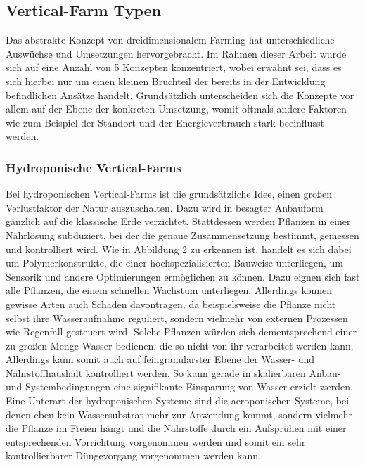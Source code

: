 \subsection{Vertical-Farm Typen}
Das abstrakte Konzept von dreidimensionalem Farming hat unterschiedliche Auswüchse und Umsetzungen hervorgebracht. Im Rahmen dieser Arbeit wurde sich auf eine Anzahl von 5 Konzepten konzentriert, wobei erwähnt sei, dass es sich hierbei nur um einen kleinen Bruchteil der bereits in der Entwicklung befindlichen Ansätze handelt. Grundsätzlich unterscheiden sich die Konzepte vor allem auf der Ebene der konkreten Umsetzung, womit oftmals andere Faktoren wie zum Beispiel der Standort und der Energieverbrauch stark beeinflusst werden.
\subsubsection{Hydroponische Vertical-Farms}
Bei hydroponischen Vertical-Farms ist die grundsätzliche Idee, einen großen Verlustfaktor der Natur auszuschalten. Dazu wird in besagter Anbauform gänzlich auf die klassische Erde verzichtet. Stattdessen werden Pflanzen in einer Nährlösung subduziert, bei der die genaue Zusammensetzung bestimmt, gemessen und kontrolliert wird. Wie in Abbildung 2 zu erkennen ist, handelt es sich dabei um Polymerkonstrukte, die einer hochspezialisierten Bauweise unterliegen, um Sensorik und andere Optimierungen ermöglichen zu können. Dazu eignen sich fast alle Pflanzen, die einem schnellen Wachstum unterliegen. Allerdings können gewisse Arten auch Schäden davontragen, da beispielsweise die Pflanze nicht selbst ihre Wasseraufnahme reguliert, sondern vielmehr von externen Prozessen wie Regenfall gesteuert wird. Solche Pflanzen würden sich dementsprechend einer zu großen Menge Wasser bedienen, die so nicht von ihr verarbeitet werden kann. Allerdings kann somit auch auf feingranularster Ebene der Wasser- und Nährstoffhaushalt kontrolliert werden. So kann gerade in skalierbaren Anbau- und Systembedingungen eine signifikante Einsparung von Wasser erzielt werden. Eine Unterart der hydroponischen Systeme sind die aeroponischen Systeme, bei denen eben kein Wassersubstrat mehr zur Anwendung kommt, sondern vielmehr die Pflanze im Freien hängt und die Nährstoffe durch ein Aufsprühen mit einer entsprechenden Vorrichtung vorgenommen werden und somit ein sehr kontrollierbarer Düngevorgang vorgenommen werden kann.

